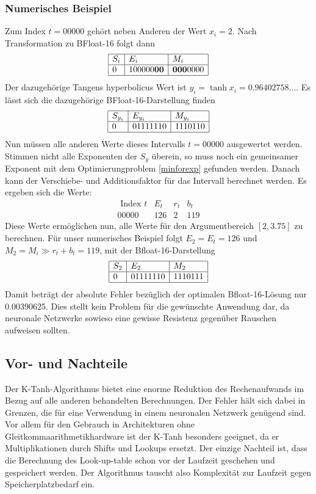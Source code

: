 \subsubsection{Numerisches Beispiel
\label{transfer:subsection:Ktanh-Algorithmus:Num}}
Zum Index $t = 00000$ gehört neben Anderen der Wert $x_i = 2$.
Nach Transformation zu BFloat-16 folgt dann
\[
\begin{array}{|l|l|l|}
	\hline S_i & E_{i} & M_{i} \\
	\hline 0 & 100000 \textbf{00} & \textbf{000} 0000 \\
	\hline
\end{array}
\]
Der dazugehörige Tangens hyperbolicus Wert ist
$y_i = \tanh{x_i}=0.96402758\ldots$. Es lässt sich die dazugehörige BFloat-16-Darstellung finden
\[
\begin{array}{|l|l|l|}
	\hline S_{y_{i}} & E_{y_{i}} & M_{y_{i}} \\
	\hline 0 & 01111110 & 1110110 \\
	\hline
\end{array}
\]
Nun müssen alle anderen Werte dieses Intervalls $t = 00000$ ausgewertet werden. Stimmen nicht alle Exponenten der $S_{y}$ überein, so muss noch ein gemeinsamer Exponent mit dem Optimierungproblem \ref{minforexp} gefunden werden. Danach kann der Verschiebe- und Additionsfaktor für das Intervall berechnet werden. 
Es ergeben sich die Werte:
\[
\begin{array}{c|ccc}
	\text { Index } t & E_{t} & r_{t} & b_{t} \\
	\hline 00000 & 126 & 2 & 119
\end{array}
\]
Diese Werte ermöglichen nun, alle Werte für den Argumentbereich
$[2,3.75]$ zu berechnen.
Für unser numerisches Beispiel folgt $E_2 = E_t = 126$ und
$M_2 = M_i \gg r_t + b_t = 119$,
mit der Bfloat-16-Darstellung
\[
\begin{array}{|l|l|l|}
	\hline S_{2} & E_{2} & M_{2} \\
	\hline 0 & 01111110 & 1110111 \\
	\hline
\end{array}
\]
Damit beträgt der absolute Fehler bezüglich der optimalen Bfloat-16-Lösung
nur 0.00390625.
Dies stellt kein Problem für die gewünschte Anwendung dar, da
neuronale Netzwerke sowieso eine gewisse Resistenz gegenüber Rauschen
aufweisen sollten.


\subsection{Vor- und Nachteile}
Der K-Tanh-Algorithmus bietet eine enorme Reduktion des Rechenaufwands
im Bezug auf alle anderen behandelten Berechnungen. Der Fehler hält
sich dabei in Grenzen, die für eine Verwendung in einem neuronalen
Netzwerk genügend sind. Vor allem für den Gebrauch in Architekturen
ohne Gleitkommaarithmetikhardware ist der K-Tanh besonders geeignet,
da er Multiplikationen durch Shifts und Lookups ersetzt.
Der einzige Nachteil ist, dass die Berechnung des Look-up-table schon
vor der Laufzeit geschehen und gespeichert werden.
Der Algorithmus tauscht also Komplexität zur Laufzeit gegen Speicherplatzbedarf
ein.







